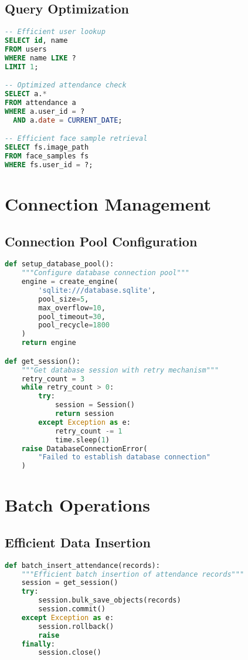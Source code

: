 \subsection{Query Optimization}
\begin{lstlisting}[language=SQL]
-- Efficient user lookup
SELECT id, name 
FROM users 
WHERE name LIKE ? 
LIMIT 1;

-- Optimized attendance check
SELECT a.* 
FROM attendance a 
WHERE a.user_id = ? 
  AND a.date = CURRENT_DATE;

-- Efficient face sample retrieval
SELECT fs.image_path 
FROM face_samples fs 
WHERE fs.user_id = ?;
\end{lstlisting}

\section{Connection Management}

\subsection{Connection Pool Configuration}
\begin{lstlisting}[language=Python]
def setup_database_pool():
    """Configure database connection pool"""
    engine = create_engine(
        'sqlite:///database.sqlite',
        pool_size=5,
        max_overflow=10,
        pool_timeout=30,
        pool_recycle=1800
    )
    return engine

def get_session():
    """Get database session with retry mechanism"""
    retry_count = 3
    while retry_count > 0:
        try:
            session = Session()
            return session
        except Exception as e:
            retry_count -= 1
            time.sleep(1)
    raise DatabaseConnectionError(
        "Failed to establish database connection"
    )
\end{lstlisting}

\section{Batch Operations}

\subsection{Efficient Data Insertion}
\begin{lstlisting}[language=Python]
def batch_insert_attendance(records):
    """Efficient batch insertion of attendance records"""
    session = get_session()
    try:
        session.bulk_save_objects(records)
        session.commit()
    except Exception as e:
        session.rollback()
        raise
    finally:
        session.close()
\end{lstlisting}


